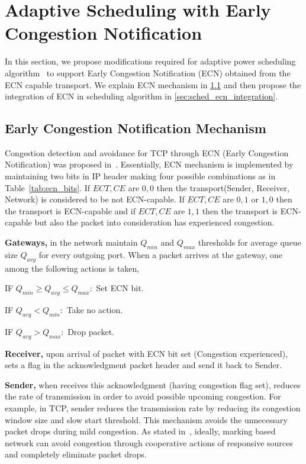 \section{Adaptive Scheduling with Early Congestion Notification}
\label{sec:adaptive_with_ecn}

In this section, we propose modifications required for adaptive power scheduling algorithm~\cite{acsmartgrid} to support Early Congestion Notification (ECN) obtained from the ECN capable transport. We explain ECN mechanism in \ref{sec:explain_ecn} and then propose the integration of ECN in scheduling algorithm in \ref{sec:sched_ecn_integration}.

\subsection{Early Congestion Notification Mechanism}
\label{sec:explain_ecn} 

Congestion detection and avoidance for TCP through ECN (Early Congestion Notification) 
was proposed in~\cite{floyd1994tcp}. Essentially, ECN mechanism is implemented by 
maintaining two bits in IP header making four possible combinations as in 
Table~\ref{tab:ecn_bits}. If $ECT, CE$ are $0,0$ then the transport(Sender, Receiver, Network)
is considered to be not ECN-capable. If $ECT, CE$ are $0, 1$ or $1, 0$ then the transport is
ECN-capable and if $ECT, CE$ are $1, 1$ then the transport is ECN-capable but also the packet into
consideration has experienced congestion. 

{\bf Gateways,} in the network maintain $Q_{min}$ and $Q_{max}$ thresholds for average queue size $Q_{avg}$ for every
outgoing port. When a packet arrives at the gateway, one among the following actions is taken,

\null
IF $Q_{min} \geq Q_{avg} \leq Q_{max}:$ Set ECN bit. 

IF $Q_{avg} < Q_{min}:$ Take no action.

IF $Q_{avg} > Q_{max}:$ Drop packet.

\null
{\bf Receiver,} upon arrival of packet with ECN bit set (Congestion experienced), sets a flag in the acknowledgment 
packet header and send it back to Sender.

{\bf Sender,} when receives this acknowledgment (having congestion flag set), reduces the rate of transmission in order to avoid possible upcoming 
congestion. For example, in TCP, sender reduces the transmission rate by reducing its congestion window size and slow start threshold.
This mechanism avoids the unnecessary packet drops during mild congestion. As stated in~\cite{marekecnstudy}, ideally, marking based
network can avoid congestion through cooperative actions of responsive sources and completely eliminate packet drops.

